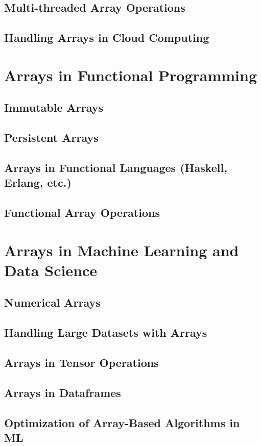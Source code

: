 \documentclass[12pt, oneside]{book}
\begin{document}
	\section{Multi-threaded Array Operations}
	\section{Handling Arrays in Cloud Computing}
	
	\chapter{Arrays in Functional Programming}
	\section{Immutable Arrays}
	\section{Persistent Arrays}
	\section{Arrays in Functional Languages (Haskell, Erlang, etc.)}
	\section{Functional Array Operations}
	
	\chapter{Arrays in Machine Learning and Data Science}
	\section{Numerical Arrays}
	\section{Handling Large Datasets with Arrays}
	\section{Arrays in Tensor Operations}
	\section{Arrays in Dataframes}
	\section{Optimization of Array-Based Algorithms in ML}
	
\end{document}
